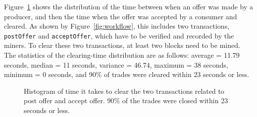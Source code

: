 Figure~\ref{fig:offer_histogram} shows the distribution of the time between when an offer was made by a producer, and then the time when the offer was accepted by a consumer and cleared. As shown by Figure~\ref{fig:workflow}, this includes two transactions, \texttt{postOffer} and \texttt{acceptOffer}, which have to be verified and recorded by the miners. To clear these two transactions, at least two blocks need to be mined. The statistics of the clearing-time distribution are as follows: 
average = 11.79 seconds, median = 11 seconds, variance = 46.74, maximum = 38 seconds, minimum = 0 seconds, and 90\% of trades were cleared within 23 seconds or less.



\begin{figure}[t]
\vspace{-1em}
\caption{Histogram of time it takes to clear the two transactions related to post offer and accept offer. 90\% of the trades were closed within 23 seconds or less.}
\label{fig:offer_histogram}
\end{figure}

